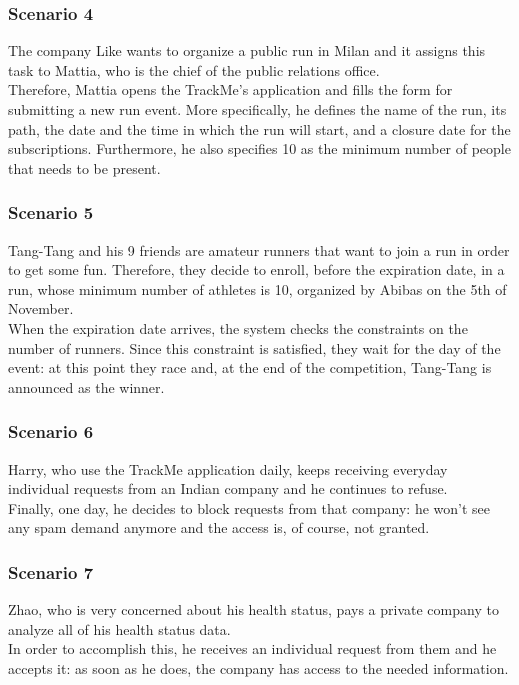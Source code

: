 \subsubsection{Scenario 4}
The company Like wants to organize a public run in Milan and it assigns this task to Mattia, who is the chief of the public relations office. \\
Therefore, Mattia opens the TrackMe's application and fills the form for submitting a new run event. 
More specifically, he defines the name of the run, its path, the date and the time in which the run will start, and a closure date for the subscriptions. 
Furthermore, he also specifies 10 as the minimum number of people that needs to be present.

\subsubsection{Scenario 5}
Tang-Tang and his 9 friends are amateur runners that want to join a run in order to get some fun. 
Therefore, they decide to enroll, before the expiration date, in a run, whose minimum number of athletes is 10, organized by Abibas on the 5th of November. \\
When the expiration date arrives, the system checks the constraints on the number of runners. 
Since this constraint is satisfied, they wait for the day of the event: at this point they race and, at the end of the competition, Tang-Tang is announced as the winner. 

\subsubsection{Scenario 6}
Harry, who use the TrackMe application daily, keeps receiving everyday individual requests from an Indian company and he continues to refuse.\\
Finally, one day, he decides to block requests from that company: he won't see any spam demand anymore and the access is, of course, not granted. 

\subsubsection{Scenario 7}
Zhao, who is very concerned about his health status, pays a private company to analyze all of his health status data. \\ 
In order to accomplish this, he receives an individual request from them and he accepts it: as soon as he does, the company has access to the needed information.

